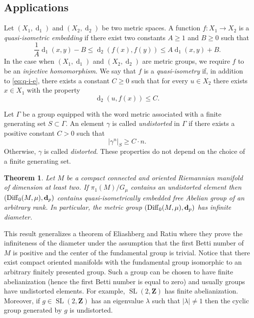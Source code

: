 \documentclass[a4paper,12pt]{amsart}
\def\Diff{\operatorname{Diff}}
\def\g{\gamma}
\newtheorem{thm}{Theorem}[section]
\theoremstyle{definition}
\def\OP{\operatorname}
\def\B{\mathbf}
\begin{document}
\subsection{Applications}\label{SS:applications}

Let $(X_1,\OP{d}_1)$ and $(X_2,\OP{d}_2)$ be two metric spaces. A function
$f\colon X_1\to X_2$
is a \emph{quasi-isometric embedding} if there exist
two constants $A\geq1$ and $B\geq0$ such that
\begin{equation}\label{eq:q-i-e}
\frac{1}{A}\OP{d}_1(x,y)-B\leq \OP{d}_2(f(x),f(y))\leq A\OP{d}_1(x,y)+B.
\end{equation}
In the case when $(X_1,\OP{d}_1)$ and $(X_2,\OP{d}_2)$ are metric groups, we
require $f$ to be an \emph{injective homomorphism}.  We say that $f$ is a
\emph{quasi-isometry} if, in addition to \eqref{eq:q-i-e},
there exists a constant $C\geq0$ such that for every $u\in X_2$ there
exists $x\in X_1$ with the property
$$\OP{d}_2(u,f(x))\leq C.$$

Let $\Gamma$ be a group equipped with
the word metric associated with a finite generating set $S\subset \Gamma$.
An element $\g$ is called {\em undistorted}
in $\Gamma$ if there exists a positive constant $C>0$ such that
$$
|\g^n|_S\geq C\cdot n.
$$
Otherwise, $\g$ is called {\em distorted}.
These properties do not depend on the choice of a finite
generating set.

\begin{thm}\label{T:undistorted}
Let $M$ be a compact connected and oriented Riemannian manifold of
dimension at least two. If $\pi_1(M)/G_{\mu}$ contains an undistorted
element then $(\Diff_0(M,\mu),{\bf d}_p)$ contains quasi-isometrically
embedded free Abelian group of an arbitrary rank. In particular,
the metric group $(\Diff_0(M,\mu),{\bf d}_p)$ has infinite diameter.
\end{thm}

This result generalizes a theorem of Eliashberg and Ratiu \cite{ER}
where they prove the infiniteness of the diameter under the assumption
that the first Betti number of $M$ is positive and the center of the
fundamental group is trivial. Notice that there exist compact
oriented manifolds with the fundamental group isomorphic to an
arbitrary finitely presented group. Such a group can be chosen to have
finite abelianization (hence the first Betti number is equal to zero)
and usually groups have undistorted elements. For example,
$\OP{SL}(2,\B Z)$ has finite abelianization.
Moreover, if $g\in \OP{SL}(2,\B Z)$ has an eigenvalue
$\lambda$ such that $|\lambda|\neq 1$ then the cyclic group generated
by $g$ is undistorted.
\end{document}
